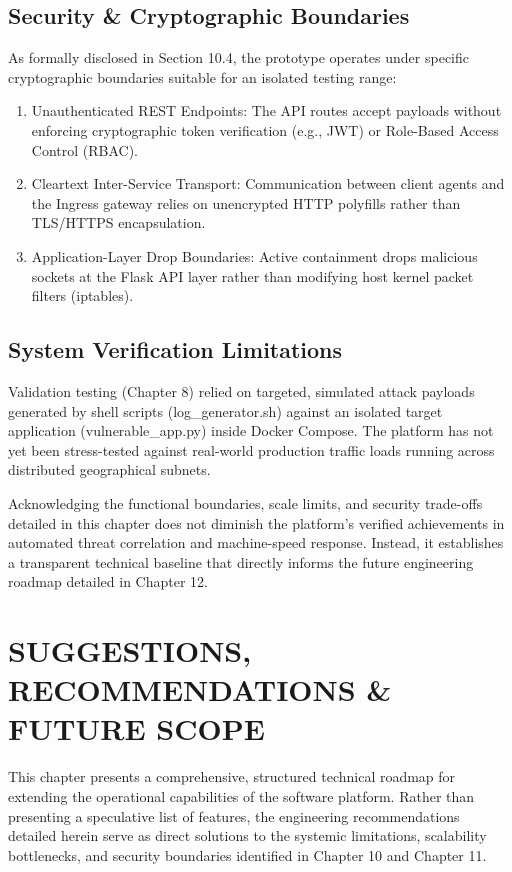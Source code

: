 \section{Security \& Cryptographic Boundaries}

As formally disclosed in Section 10.4, the prototype operates under specific cryptographic boundaries suitable for an isolated testing range:

\begin{enumerate}
  \item Unauthenticated REST Endpoints: The API routes accept payloads without enforcing cryptographic token verification (e.g., JWT) or Role-Based Access Control (RBAC).
  \item Cleartext Inter-Service Transport: Communication between client agents and the Ingress gateway relies on unencrypted HTTP polyfills rather than TLS/HTTPS encapsulation.
  \item Application-Layer Drop Boundaries: Active containment drops malicious sockets at the Flask API layer rather than modifying host kernel packet filters (iptables).
\end{enumerate}

\section{System Verification Limitations}

Validation testing (Chapter 8) relied on targeted, simulated attack payloads generated by shell scripts (log\_generator.sh) against an isolated target application (vulnerable\_app.py) inside Docker Compose. The platform has not yet been stress-tested against real-world production traffic loads running across distributed geographical subnets.

Acknowledging the functional boundaries, scale limits, and security trade-offs detailed in this chapter does not diminish the platform's verified achievements in automated threat correlation and machine-speed response. Instead, it establishes a transparent technical baseline that directly informs the future engineering roadmap detailed in Chapter 12.

\newpage
\chapter{SUGGESTIONS, RECOMMENDATIONS \& FUTURE SCOPE}

This chapter presents a comprehensive, structured technical roadmap for extending the operational capabilities of the software platform. Rather than presenting a speculative list of features, the engineering recommendations detailed herein serve as direct solutions to the systemic limitations, scalability bottlenecks, and security boundaries identified in Chapter 10 and Chapter 11.

